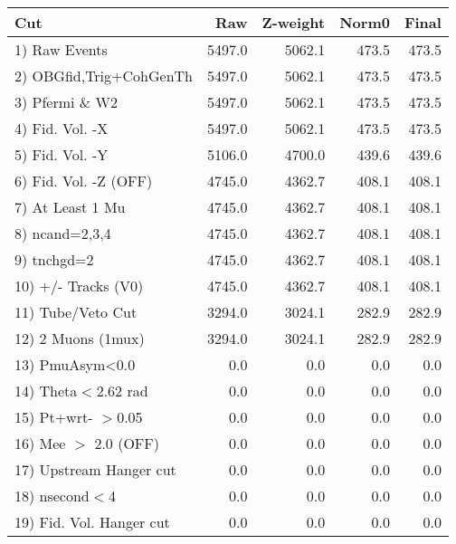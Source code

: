  \begin{table}[h!]\centering
 \begin{tabular}{||l||r|r|r|r||}
 \hline
 \hline
 Cut & Raw & Z-weight & Norm0 & Final \\
 \hline
  1) Raw Events           &      5497.0 &      5062.1 &       473.5 &       473.5 \\
  2) OBGfid,Trig+CohGenTh &      5497.0 &      5062.1 &       473.5 &       473.5 \\
  3) Pfermi \& W2         &      5497.0 &      5062.1 &       473.5 &       473.5 \\
  4) Fid. Vol. -X         &      5497.0 &      5062.1 &       473.5 &       473.5 \\
  5) Fid. Vol. -Y         &      5106.0 &      4700.0 &       439.6 &       439.6 \\
  6) Fid. Vol. -Z (OFF)   &      4745.0 &      4362.7 &       408.1 &       408.1 \\
  7) At Least 1 Mu        &      4745.0 &      4362.7 &       408.1 &       408.1 \\
  8) ncand=2,3,4          &      4745.0 &      4362.7 &       408.1 &       408.1 \\
  9) tnchgd=2             &      4745.0 &      4362.7 &       408.1 &       408.1 \\
 10) +/- Tracks (V0)      &      4745.0 &      4362.7 &       408.1 &       408.1 \\
 11) Tube/Veto Cut        &      3294.0 &      3024.1 &       282.9 &       282.9 \\
 12) 2 Muons (1mux)       &      3294.0 &      3024.1 &       282.9 &       282.9 \\
 13) PmuAsym<0.0          &         0.0 &         0.0 &         0.0 &         0.0 \\
 14) Theta$<$2.62 rad     &         0.0 &         0.0 &         0.0 &         0.0 \\
 15) Pt+wrt- $>$0.05      &         0.0 &         0.0 &         0.0 &         0.0 \\
 16) Mee $>$ 2.0  (OFF)   &         0.0 &         0.0 &         0.0 &         0.0 \\
 17) Upstream Hanger cut  &         0.0 &         0.0 &         0.0 &         0.0 \\
 18) nsecond$<$4          &         0.0 &         0.0 &         0.0 &         0.0 \\
 19) Fid. Vol. Hanger cut &         0.0 &         0.0 &         0.0 &         0.0 \\

\end{tabular}
\end{table}
